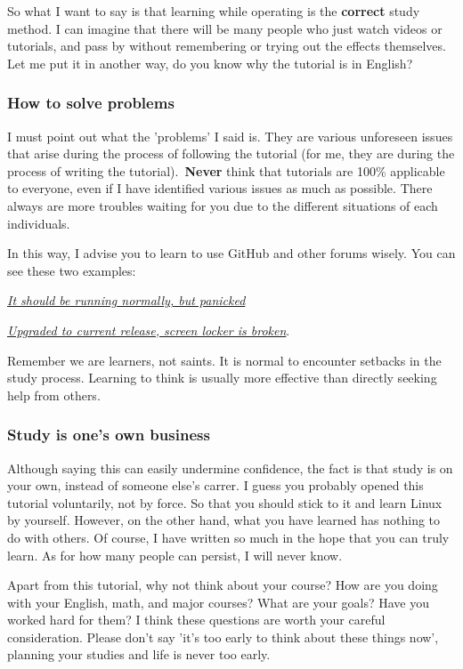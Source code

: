 \documentclass[12pt]{ctexart}
\begin{document}
So what I want to say is that learning while operating is the
\textbf{correct} study method. I can imagine that there will be many
people who just watch videos or tutorials, and pass by without
remembering or trying out the effects themselves. Let me put it in
another way, do you know why the tutorial is in English?

\subsubsection*{\textbf{How to solve problems}}

I must point out what the 'problems' I
said is. They are various unforeseen issues that arise during the
process of following the tutorial (for me, they are during the process
of writing the tutorial).\ \textbf{Never} think that tutorials are 100\%
applicable to everyone, even if I have identified various issues as much
as possible. There always are more troubles waiting for you due to the
different situations of each individuals.

In this way, I advise you to learn to use GitHub and other forums
wisely. You can see these two examples:

\href{https://github.com/iffse/pay-respects/issues/34}{\textit{It should be
running normally, but panicked}}

\href{https://www.reddit.com/r/kde/comments/zlr6hb/upgraded_to_current_release_screen_locker_is/}{\textit{Upgraded
to current release, screen locker is broken}}.

Remember we are learners, not saints. It is normal to encounter
setbacks in the study process. Learning to think is usually more
effective than directly seeking help from others.

\subsubsection*{\textbf{Study is one's own business}}

Although saying this can easily undermine confidence, the fact is that
study is on your own, instead of someone else's carrer.
I guess you probably opened this tutorial voluntarily, not by force. So
that you should stick to it and learn Linux by yourself. However, on the
other hand, what you have learned has nothing to do with others. Of
course, I have written so much in the hope that you can truly learn. As
for how many people can persist, I will never know.

Apart from this tutorial, why not think about your course? How are you
doing with your English, math, and major courses? What are your goals?
Have you worked hard for them? I think these questions are worth your
careful consideration. Please don't say
'it's too early to think about these
things now', planning your studies and life is never too
early.
\end{document}
